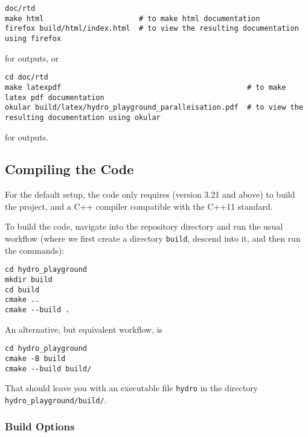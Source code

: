 \begin{lstlisting}
doc/rtd
make html                      # to make html documentation
firefox build/html/index.html  # to view the resulting documentation using firefox
\end{lstlisting}


for  outputs, or

\begin{lstlisting}
cd doc/rtd
make latexpdf                                           # to make latex pdf documentation
okular build/latex/hydro_playground_paralleisation.pdf  # to view the resulting documentation using okular
\end{lstlisting}

for  outputs.








\subsection{Compiling the Code}

For the default setup, the code only requires \cmake (version 3.21 and
above) to build the project, and a C++ compiler compatible with the C++11
standard.

To build the code, navigate into the repository directory and run the usual
\cmake workflow (where we first create a directory \verb|build|, descend
into it, and then run the \cmake commands):

\begin{lstlisting}
cd hydro_playground
mkdir build
cd build
cmake ..
cmake --build .
\end{lstlisting}

An alternative, but equivalent workflow, is

\begin{lstlisting}
cd hydro_playground
cmake -B build
cmake --build build/
\end{lstlisting}


That should leave you with an executable file \verb|hydro| in the directory
\verb|hydro_playground/build/|.







\subsubsection{Build Options}


